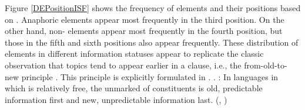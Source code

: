Figure \ref{DEPositionISF} shows the frequency of elements and their positions
based on .
Anaphoric elements appear most frequently in the third position.
On the other hand, non- elements appear most frequently in the fourth position,
but those in the fifth and sixth positions also appear frequently.
These distribution of elements in different information statuses appear to replicate the classic observation that
topics tend to appear earlier in a clause,
i.e., the from-old-to-new principle \cite{mathesius28,firbas64,danes70,kuno78,gundel88}. This principle is explicitly formulated in \Next.
%
\ex. \label{oldnewprinciple}:
 In languages in which  is relatively free,
 the unmarked  of constituents is old,
 predictable information first and new, unpredictable information last.
 \hfill{(, )}

